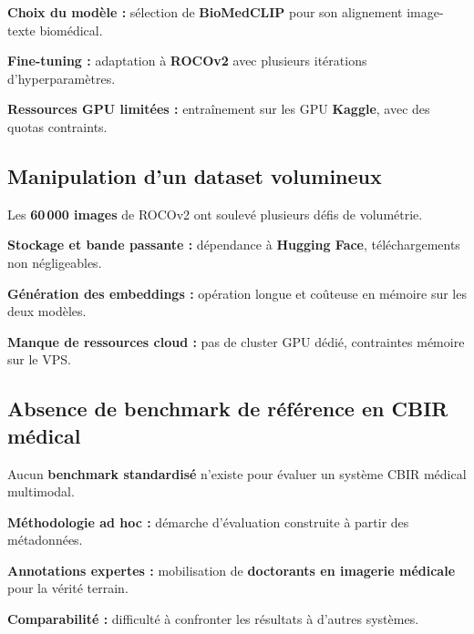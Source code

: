 \documentclass[12pt,a4paper]{article}
\begin{document}
\vspace{0.15cm}
\begin{sq}
  \item \textbf{Choix du modèle :} sélection de \textbf{BioMedCLIP} pour son alignement image-texte biomédical.
  \item \textbf{Fine-tuning :} adaptation à \textbf{ROCOv2} avec plusieurs itérations d'hyperparamètres.
  \item \textbf{Ressources GPU limitées :} entraînement sur les GPU \textbf{Kaggle}, avec des quotas contraints.
\end{sq}

\vspace{0.5cm}

\subsection{Manipulation d'un dataset volumineux}

\vspace{0.15cm}
Les \textbf{60\,000 images} de ROCOv2 ont soulevé plusieurs défis de volumétrie.

\vspace{0.15cm}
\begin{sq}
  \item \textbf{Stockage et bande passante :} dépendance à \textbf{Hugging Face}, téléchargements non négligeables.
  \item \textbf{Génération des embeddings :} opération longue et coûteuse en mémoire sur les deux modèles.
  \item \textbf{Manque de ressources cloud :} pas de cluster GPU dédié, contraintes mémoire sur le VPS.
\end{sq}

\vspace{0.5cm}

\subsection{Absence de benchmark de référence en CBIR médical}

\vspace{0.15cm}
Aucun \textbf{benchmark standardisé} n'existe pour évaluer un système CBIR médical multimodal.

\vspace{0.15cm}
\begin{sq}
  \item \textbf{Méthodologie ad hoc :} démarche d'évaluation construite à partir des métadonnées.
  \item \textbf{Annotations expertes :} mobilisation de \textbf{doctorants en imagerie médicale} pour la vérité terrain.
  \item \textbf{Comparabilité :} difficulté à confronter les résultats à d'autres systèmes.
\end{sq}
\end{document}
